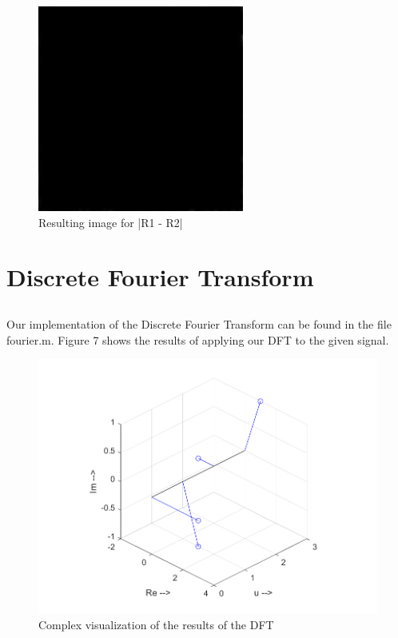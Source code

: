 \documentclass[12pt,a4paper]{article}
\begin{document}
\begin{figure}[h]
	\begin{center}
		\includegraphics[scale=1]{./images/imDiff.png}
		\caption{Resulting image for |R1 - R2|} 
	\end{center}
\end{figure}

\clearpage
\section{Discrete Fourier Transform}
\subsection{}
Our implementation of the Discrete Fourier Transform can be found in the file fourier.m. Figure 7 shows the results of applying our DFT to the given signal.

\begin{figure}[h]
	\begin{center}
		\includegraphics[scale=1]{./images/Stemcomplex.png}
		\caption{Complex visualization of the results of the DFT} 
	\end{center}
\end{figure}
\end{document}
